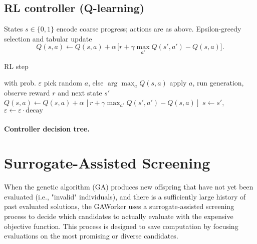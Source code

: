 \documentclass[12pt,a4paper]{article}
\begin{document}
\subsection{RL controller (Q-learning)}
States $s\in\{0,1\}$ encode coarse progress; actions are as above. Epsilon-greedy selection and tabular update
\[ Q(s,a) \leftarrow Q(s,a) + \alpha\,\big[ r + \gamma \max_{a'} Q(s',a') - Q(s,a)\big]. \]
\begin{algorithm}[H]
\caption{RL step}
\begin{algorithmic}[1]
\State with prob. $\varepsilon$ pick random $a$, else $\arg\max_a Q(s,a)$
\State apply $a$, run generation, observe reward $r$ and next state $s'$
\State $Q(s,a)\leftarrow Q(s,a)+\alpha\,[r+\gamma\max_{a'}Q(s',a')-Q(s,a)]$
\State $s\leftarrow s'$, $\varepsilon\leftarrow \varepsilon\cdot\text{decay}$
\end{algorithmic}
\end{algorithm}

\paragraph{Controller decision tree.}
\begin{center}
\end{center}

\section{Surrogate-Assisted Screening}
When the genetic algorithm (GA) produces new offspring that have not yet been evaluated (i.e., "invalid" individuals), and there is a sufficiently large history of past evaluated solutions, the GAWorker uses a surrogate-assisted screening process to decide which candidates to actually evaluate with the expensive objective function. This process is designed to save computation by focusing evaluations on the most promising or diverse candidates.
\end{document}
